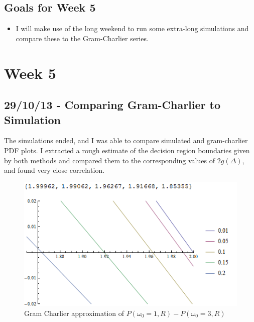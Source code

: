\subsection{Goals for Week 5}

\begin{itemize}
\itemsep1pt\parskip0pt
\item
  I will make use of the long weekend to run some extra-long simulations
  and compare these to the Gram-Charlier series.
\end{itemize}

\section{Week 5}

\subsection{29/10/13 - Comparing Gram-Charlier to Simulation}

The simulations ended, and I was able to compare simulated and
gram-charlier PDF plots. I extracted a rough estimate of the decision
region boundaries given by both methods and compared them to the
corresponding values of $2 g(\Delta)$, and found very close correlation.

\begin{figure}[htbp]
\centering
\includegraphics{../plots/gcdrb.png}
\caption{Gram Charlier approximation of
$P(\omega_0=1,R)-P(\omega_0=3,R)$}
\end{figure}

